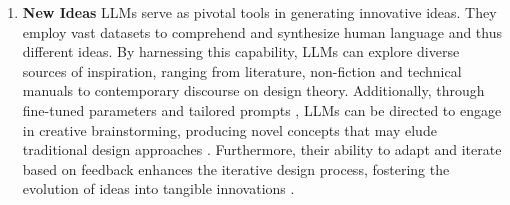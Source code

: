 \documentclass{article}
\begin{document}
\begin{enumerate}
    \item \textbf{New Ideas} LLMs serve as pivotal tools in generating innovative ideas. They employ vast datasets to comprehend and synthesize human language and thus different ideas. By harnessing this capability, LLMs can explore diverse sources of inspiration, ranging from literature, non-fiction and technical manuals to contemporary discourse on design theory. Additionally, through fine-tuned parameters and tailored prompts , LLMs can be directed to engage in creative brainstorming, producing novel concepts that may elude traditional design approaches \cite{shaer2024ai}. Furthermore, their ability to adapt and iterate based on feedback enhances the iterative design process, fostering the evolution of ideas into tangible innovations \cite{gramopadhye2024few}. 
    

\end{enumerate}
\end{document}
